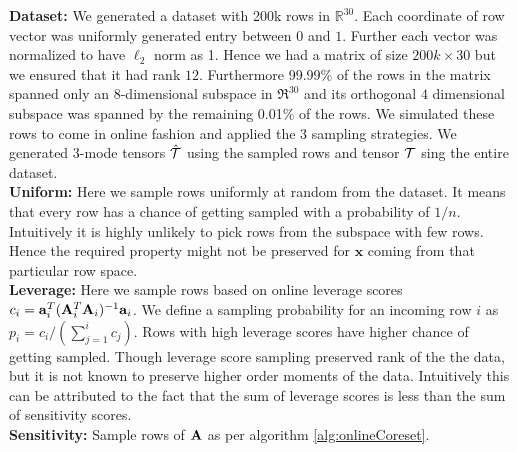 
\noindent\textbf{Dataset:} We generated a dataset with 200k rows in $\mathbb{R}^{30}$. Each coordinate of row vector was uniformly generated entry between $0$ and $1$. Further each vector was normalized to have $\ell_{2}$ norm as 1. Hence we had a matrix of size $200k \times 30$ but we ensured that it had rank $12$. Furthermore 99.99\% of the rows in the matrix spanned only an 8-dimensional subspace in $\Re^{30}$ and its orthogonal $4$ dimensional subspace was spanned by the remaining 0.01\% of the rows. We simulated these rows to come in online fashion and applied the 3 sampling strategies. We generated 3-mode tensors $\mathbf{\mathcal{\hat{T}}}$ using the sampled rows and tensor $\mathbf{\mathcal{T}}$ sing the entire dataset.\\
\noindent\textbf{Uniform:} Here we sample rows uniformly at random from the dataset. It means that every row has a chance of getting sampled with a probability of $1/n$. Intuitively it is highly unlikely to pick rows from the subspace with few rows. Hence the required property might not be preserved for $\mathbf{x}$ coming from that particular row space. \\
% 
\noindent\textbf{Leverage:} Here we sample rows based on online leverage scores $c_{i} = \mathbf{a}_{i}^{T}(\mathbf{A}_{i}^{T}\mathbf{A}_{i})^{-1}\mathbf{a}_{i}$. We define a sampling probability for an incoming row $i$ as $p_{i} = c_{i}/(\sum_{j=1}^{i}c_{j})$. Rows with high leverage scores have higher chance of getting sampled. Though leverage score sampling preserved rank of the the data, but it is not known to preserve  higher order moments of the data. Intuitively this can be attributed to the fact that the sum of leverage scores is less than the sum of sensitivity scores.\\
%
\noindent\textbf{Sensitivity:} Sample rows of $\mathbf{A}$ as per algorithm \ref{alg:onlineCoreset}.

